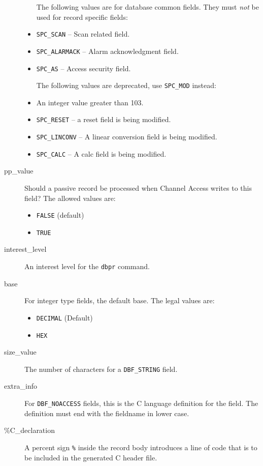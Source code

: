 \begin{description}
\begin{itemize}
The following values are for database common fields.
They must \emph{not} be used for record specific fields:

\item \verb|SPC_SCAN| -- Scan related field.

\item \verb|SPC_ALARMACK| -- Alarm acknowledgment field.

\item \verb|SPC_AS| -- Access security field.

The following values are deprecated, use \verb|SPC_MOD| instead:

\item An integer value greater than 103.

\item \verb|SPC_RESET| -- a reset field is being modified.

\item \verb|SPC_LINCONV| -- A linear conversion field is being modified.

\item \verb|SPC_CALC| -- A calc field is being modified.
\end{itemize}

\item [pp\_value] Should a passive record be processed when Channel Access writes to this field?
The allowed values are:

\begin{itemize}
\item \verb|FALSE| (default)
\item \verb|TRUE|
\end{itemize}

\item [interest\_level] An interest level for the \verb|dbpr| command.

\item [base] For integer type fields, the default base.
The legal values are:

\begin{itemize}
\item \verb|DECIMAL| (Default)
\item \verb|HEX|
\end{itemize}

\item [size\_value] The number of characters for a \verb|DBF_STRING| field.

\item [extra\_info] For \verb|DBF_NOACCESS| fields, this is the C language definition for the field.
The definition must end with the fieldname in lower case.

\item [\%C\_declaration] A percent sign \verb|%| inside the record body introduces a line of code that is to be included in the generated C header file.
\end{description}

